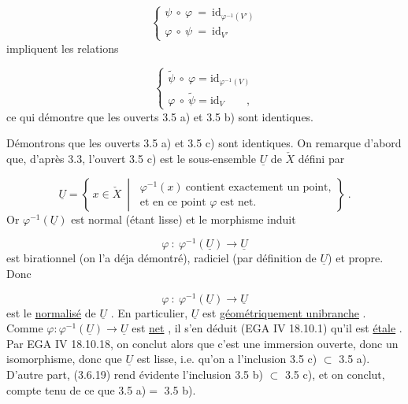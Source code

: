 
\begin{equation*}
 \left\{ \begin{array}{l} \psi \ \circ \ \varphi \ = \ \mathrm{id}_{\varphi^{-1}(V')} \\[3ex] \varphi \ \circ \ \psi \ = \ \mathrm{id}_{V'} \end{array} \right.
\end{equation*}
impliquent les relations

\begin{equation*}
\left\{ \begin{array}{l} \widetilde{\psi} \ \circ \ \varphi = \mathrm{id}_{\varphi^{-1}(V)} \\[3ex] \varphi \ \circ \ \widetilde{\psi} = \mathrm{id}_{V} \qquad , \end{array} \right.
\end{equation*}
ce qui démontre que les ouverts 3.5 a) et 3.5 b) sont identiques.

Démontrons que les ouverts 3.5 a) et 3.5 c) sont identiques. On remarque d'abord que, d'après 3.3, l'ouvert 3.5 c) est le sous-ensemble $\underline{U}$ de $\check{X}$ défini par

\begin{equation}\tag{3.6.19}
\underline{U} = \left\{\, x \in \check{X} \ \middle|\ \begin{array}{l} \varphi^{-1}(x) \ \mbox{contient exactement un point,} \\ \mbox{et en ce point } \varphi \mbox{ est net.} \end{array} \right\} \ .
\end{equation}
Or $\varphi^{-1}(\underline{U})$ est normal (étant lisse) et le morphisme induit

\begin{equation*}
\varphi \ : \ \varphi^{-1}(\underline{U}) \longrightarrow \underline{U}
\end{equation*}
est birationnel (on l'a déja démontré), radiciel (par définition de $\underline{U}$) et propre. Donc

\begin{equation*}
\varphi \ : \ \varphi^{-1}(\underline{U}) \longrightarrow \underline{U}
\end{equation*}
est le \underline{normalisé} de $\underline{U}$ . En particulier, $\underline{U}$ est \underline{géométriquement unibranche} . Comme $\varphi : \varphi^{-1}(\underline{U}) \longrightarrow \underline{U}$ est \underline{net} , il s'en déduit (EGA IV 18.10.1) qu'il est \underline{étale} . Par EGA IV 18.10.18, on conclut alors que c'est une immersion ouverte, donc un isomorphisme, donc que
$\underline{U}$ est lisse, i.e. qu'on a l'inclusion 3.5 c) $\subset$ 3.5 a). D'autre part, (3.6.19) rend évidente l'inclusion 3.5 b) $\subset$ 3.5 c), et on conclut, compte tenu de ce que 3.5 a)$=$ 3.5 b).

